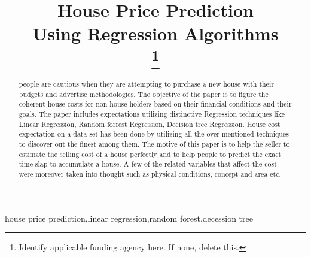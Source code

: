 \documentclass[conference]{IEEEtran}
\begin{document}
\title{House Price Prediction \\Using Regression Algorithms\\
{\footnotesize \textsuperscript{}}
\thanks{Identify applicable funding agency here. If none, delete this.}
}

\author{
\and
{}
\and
{}
}

\maketitle

\begin{abstract}
people are cautious when they are attempting to purchase a new house with their budgets and advertise methodologies. The objective of the paper is to figure the coherent house costs for non-house holders based on their financial conditions and their goals. The paper includes expectations utilizing distinctive Regression techniques like Linear Regression, Random forrest Regression, Decision tree Regression. House cost expectation on a data set has been done by utilizing all the over mentioned techniques to discover out the finest among them. The motive of this paper is to help the seller to estimate the selling cost of a house perfectly and to help people to predict the exact time slap to accumulate a house. A few of the related variables that affect the cost were moreover taken into thought such as physical conditions, concept and area etc.
\end{abstract}

\begin{IEEEkeywords}
house price prediction,linear regression,random forest,decession tree
\end{IEEEkeywords}
\end{document}
